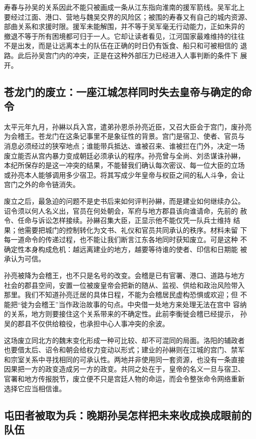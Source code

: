 寿春与孙吴的关系因此不能只被画成一条从江东指向淮南的援军箭线。吴军北上
要经过江面、港口、营地与魏吴交界的风险区；被围的寿春又有自己的城内资源、
部曲关系和求援时限。援军未能解围，并不等于吴军毫无行动能力，正如朱异的
撤退不等于所有困境都可归于一人。它却让读者看见，江河国家最难维持的往往
不是出发，而是让远离本土的队伍在正确的时日仍有饭食、船只和可被相信的
退路。此后孙吴宫门内的冲突，正是在这种外部压力已经进入人事判断的条件下
展开。

\subsection{苍龙门的废立：一座江城怎样同时失去皇帝与确定的命令}

太平元年九月，孙綝以兵入宫，遣弟孙恩杀孙亮近臣，又召大臣会于宫门，废孙亮
为会稽王。苍龙门在这条记事里不是象征性的背景。宫门是宿卫、使者、官员与
消息必须经过的狭窄地点；谁能带兵抵达、谁被召来、谁被拦在门外，决定一场
废立能否从宫内暴力变成朝廷必须承认的程序。孙亮曾与全尚、刘丞谋诛孙綝，
本纪所保存的是这一冲突的结果，不能替我们确认每次密议、每一位大臣的立场
或孙亮本人能够调用多少宿卫。将其写成少年皇帝与权臣之间的私人斗争，会让
宫门之外的命令链消失。

废立之后，最急迫的问题不是史书后来如何评判孙綝，而是建业如何继续办公。
诏令须以何人名义出，官员在何处朝会，军府与地方郡县该向谁请命，先前的
赦令、任命与诉讼怎样接续。孙綝召集大臣，正显示他不能仅凭一队兵士维持
结果；他需要把城门的控制转化为文书、礼仪和官员共同承认的秩序。材料未留
下每一道命令的传递过程，也不能让我们断言江东各地同时获知废立。可是这种
不确定性本身构成危机：越远离建业的地方，越要等待谁的使者、印信和日期能
被承认为可信。

孙亮被降为会稽王，也不只是名号的改变。会稽是已有官署、港口、道路与地方
社会的郡县空间，安置一位被废皇帝会把新的随从、监视、供给和政治风险带入
那里。我们不知道孙亮迁居的具体日程，不能为会稽居民虚构恐惧或欢迎；但
不能把“徙为会稽王”当作政治故事的句点。中央借一处地方来处理无法在宫中
容纳的关系，地方则要接住这个关系带来的不确定性。此前李衡徙会稽已经提示，
孙吴的郡县不仅供给粮役，也承担中心人事冲突的余波。

这场废立同北方的魏末变化形成一种可比较、却不可混同的局面。洛阳的辅政者
也要借太后、诏令和朝会给权力变动以形式；建业的孙綝则在江城的宫门、禁军
和宗室关系中寻找相同的可承认性。两地并非使用同一套资源，也没有一条直接
因果把一方的政变造成另一方的政变。共同之处在于，皇帝的名义一旦与宿卫、
官署和地方传报脱节，废立便不只是宫廷人物的命运，而会令整张命令网络重新
选择它应当相信谁。

\subsection{屯田者被取为兵：晚期孙吴怎样把未来收成换成眼前的队伍}

